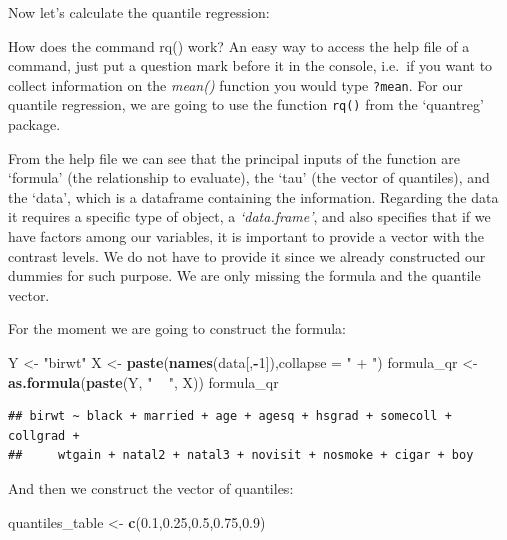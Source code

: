 \documentclass[]{book}
\newenvironment{Shaded}{\begin{snugshade}}{\end{snugshade}}
\newcommand{\KeywordTok}[1]{\textcolor[rgb]{0.13,0.29,0.53}{\textbf{#1}}}
\newcommand{\DataTypeTok}[1]{\textcolor[rgb]{0.13,0.29,0.53}{#1}}
\newcommand{\DecValTok}[1]{\textcolor[rgb]{0.00,0.00,0.81}{#1}}
\newcommand{\FloatTok}[1]{\textcolor[rgb]{0.00,0.00,0.81}{#1}}
\newcommand{\StringTok}[1]{\textcolor[rgb]{0.31,0.60,0.02}{#1}}
\newcommand{\OperatorTok}[1]{\textcolor[rgb]{0.81,0.36,0.00}{\textbf{#1}}}
\newcommand{\NormalTok}[1]{#1}
\begin{document}
Now let's calculate the quantile regression:

How does the command rq() work? An easy way to access the help file of a
command, just put a question mark before it in the console, i.e.~if you
want to collect information on the \emph{mean()} function you would type
\texttt{?mean}. For our quantile regression, we are going to use the
function \texttt{rq()} from the `quantreg' package.

From the help file we can see that the principal inputs of the function
are `formula' (the relationship to evaluate), the `tau' (the vector of
quantiles), and the `data', which is a dataframe containing the
information. Regarding the data it requires a specific type of object, a
\emph{`data.frame'}, and also specifies that if we have factors among
our variables, it is important to provide a vector with the contrast
levels. We do not have to provide it since we already constructed our
dummies for such purpose. We are only missing the formula and the
quantile vector.

For the moment we are going to construct the formula:

\begin{Shaded}
\begin{Highlighting}[]
\NormalTok{Y <-}\StringTok{ "birwt"}
\NormalTok{X <-}\StringTok{ }\KeywordTok{paste}\NormalTok{(}\KeywordTok{names}\NormalTok{(data[,}\OperatorTok{-}\DecValTok{1}\NormalTok{]),}\DataTypeTok{collapse =} \StringTok{" + "}\NormalTok{)}
\NormalTok{formula_qr <-}\StringTok{ }\KeywordTok{as.formula}\NormalTok{(}\KeywordTok{paste}\NormalTok{(Y, }\StringTok{" ~ "}\NormalTok{, X))}
\NormalTok{formula_qr}
\end{Highlighting}
\end{Shaded}

\begin{verbatim}
## birwt ~ black + married + age + agesq + hsgrad + somecoll + collgrad + 
##     wtgain + natal2 + natal3 + novisit + nosmoke + cigar + boy
\end{verbatim}

And then we construct the vector of quantiles:

\begin{Shaded}
\begin{Highlighting}[]
\NormalTok{quantiles_table <-}\StringTok{ }\KeywordTok{c}\NormalTok{(}\FloatTok{0.1}\NormalTok{,}\FloatTok{0.25}\NormalTok{,}\FloatTok{0.5}\NormalTok{,}\FloatTok{0.75}\NormalTok{,}\FloatTok{0.9}\NormalTok{)}
\end{Highlighting}
\end{Shaded}
\end{document}
